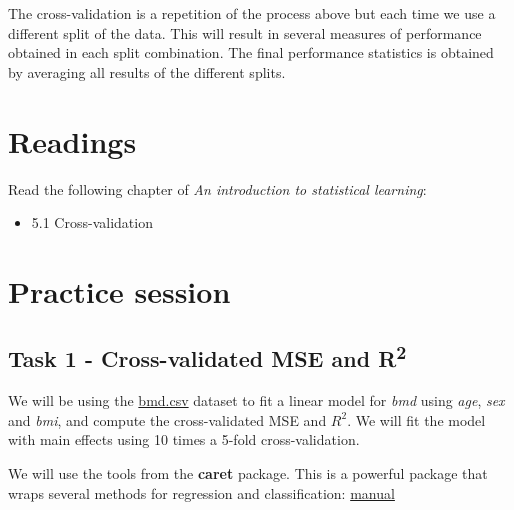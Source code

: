 \documentclass[
]{book}
\providecommand{\tightlist}{%
  \setlength{\itemsep}{0pt}\setlength{\parskip}{0pt}}
\begin{document}
The cross-validation is a repetition of the process above but each time we
use a different split of the data. This will result in several measures of
performance obtained in each split combination. The final performance
statistics is obtained by averaging all results of the different splits.

\section{Readings}\label{cv.read}

Read the following chapter of \emph{An introduction to statistical learning}:

\begin{itemize}
\tightlist
\item
  5.1 Cross-validation
\end{itemize}

\section{Practice session}\label{cv.prac}

\subsection*{\texorpdfstring{Task 1 - Cross-validated MSE and R\textsuperscript{2}}{Task 1 - Cross-validated MSE and R2}}\label{task-1---cross-validated-mse-and-r2}

We will be using the
\href{https://www.dropbox.com/s/7wjsfdaf0wt2kg2/bmd.csv?dl=1}{bmd.csv}
dataset to fit a linear model for \emph{bmd} using \emph{age}, \emph{sex} and \emph{bmi},
and compute the cross-validated MSE and \(R^2\).
We will fit the model with main effects using 10 times a 5-fold cross-validation.

We will use the tools from the \textbf{caret} package.
This is a powerful package that wraps several methods for regression and
classification: \href{http://topepo.github.io/caret/index.html}{manual}

\texttt{}
\end{document}
